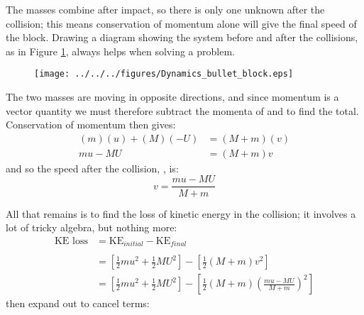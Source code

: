 

\begin{problem}
{  

 }
{}
{The masses combine after impact, so there is only one unknown after the collision; this means conservation of momentum alone will give the final speed of the block. Drawing a diagram showing the system before and after the collisions, as in Figure \ref{fig:Dynamics_bullet_block}, always helps when solving a problem.

\begin{figure}[h]
	\centering
	\texttt{[image: ../../../figures/Dynamics\_bullet\_block.eps]}
	\caption{}
	\label{fig:Dynamics_bullet_block}
\end{figure}

The two masses are moving in opposite directions, and since momentum is a vector quantity we must therefore subtract the momenta of and  to find the total. Conservation of momentum then gives:
	\begin{eqnarray*} 
	(m)(u) + (M)(-U) &= (M + m)(v) \\ 
	mu - MU &= (M + m)v
	\end{eqnarray*}
and so the speed after the collision, , is:
	\begin{equation*} 
	v = \frac{mu - MU}{M + m}
	\end{equation*}

All that remains is to find the loss of kinetic energy in the collision; it involves a lot of tricky algebra, but nothing more:
\begin{eqnarray*} 
\text{KE loss} &= \text{KE}_{initial} - \text{KE}_{final} \\ \\
	&= \left[\frac{1}{2}mu^{2} + \frac{1}{2}MU^{2}\right] - \left[\frac{1}{2}(M + m)v^{2}\right] \\
	 &=  \left[\frac{1}{2}mu^{2} + \frac{1}{2}MU^{2}\right] - \left[\frac{1}{2}(M + m)\left(\frac{mu - MU}{M + m}\right)^{2}\right]
\end{eqnarray*} then expand out to cancel terms:

}
\end{problem}
